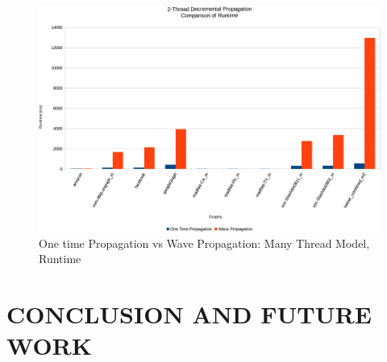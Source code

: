 \documentclass[MTech]{iitmdiss}
\begin{document}
\begin{figure}[h]
    \centering
    \includegraphics[width=\textwidth,keepaspectratio=true]{chartNewest37.pdf}
    \caption{
        One time Propagation vs Wave Propagation: Many Thread Model, Runtime
    }
    \label{fig:chart31}
\end{figure}

\chapter{CONCLUSION AND FUTURE WORK}





%
%

\pagebreak
\begin{singlespace}
  \begin{small}
	
  \end{small}
\end{singlespace}



%
\end{document}
